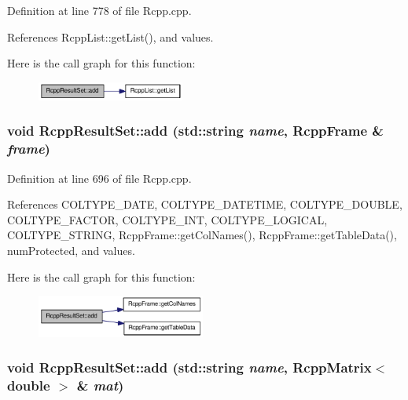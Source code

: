 Definition at line 778 of file Rcpp.cpp.

References RcppList::getList(), and values.

Here is the call graph for this function:\nopagebreak
\begin{figure}[H]
\begin{center}
\leavevmode
\includegraphics[width=137pt]{classRcppResultSet_a37b3d22adf1e47eec75ee664085daa59_cgraph}
\end{center}
\end{figure}
\hypertarget{classRcppResultSet_a9e05fb2ca92258529ffbb536e23a2a4d}{
\subsubsection[{add}]{\setlength{\rightskip}{0pt plus 5cm}void RcppResultSet::add (std::string {\em name}, \/  {\bf RcppFrame} \& {\em frame})}}
\label{classRcppResultSet_a9e05fb2ca92258529ffbb536e23a2a4d}


Definition at line 696 of file Rcpp.cpp.

References COLTYPE\_\-DATE, COLTYPE\_\-DATETIME, COLTYPE\_\-DOUBLE, COLTYPE\_\-FACTOR, COLTYPE\_\-INT, COLTYPE\_\-LOGICAL, COLTYPE\_\-STRING, RcppFrame::getColNames(), RcppFrame::getTableData(), numProtected, and values.

Here is the call graph for this function:\nopagebreak
\begin{figure}[H]
\begin{center}
\leavevmode
\includegraphics[width=157pt]{classRcppResultSet_a9e05fb2ca92258529ffbb536e23a2a4d_cgraph}
\end{center}
\end{figure}
\hypertarget{classRcppResultSet_af6f50ca0a589fc12ef68c0406e83243b}{
\subsubsection[{add}]{\setlength{\rightskip}{0pt plus 5cm}void RcppResultSet::add (std::string {\em name}, \/  {\bf RcppMatrix}$<$ double $>$ \& {\em mat})}}
\label{classRcppResultSet_af6f50ca0a589fc12ef68c0406e83243b}



